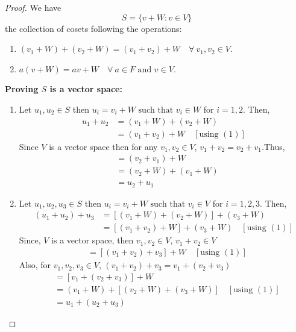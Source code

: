 \documentclass[12pt, a4paper]{article}
\theoremstyle{definition}
\theoremstyle{remark}
\newcommand{\st}{\text{ such that }}
\begin{document}
	\begin{proof}
		We have \[S = \{v+W:v \in V\}\] the collection of cosets following the operations:
		\begin{enumerate}
			\item $(v_1+W)+(v_2+W) = (v_1+v_2)+W \quad \forall \ v_1, v_2 \in V$.
			\item $a(v+W) = av+W \quad \forall \ a \in F \text{ and } v \in V$.
		\end{enumerate}
		
		\vspace{0.3cm}
		
		\noindent \textbf{Proving $S$ is a vector space:}
		
		\noindent \begin{enumerate}[label=(\alph*).]
			\item Let $u_1, u_2 \in S$ then $u_i = v_i + W \st v_i \in W$ for $i=1,2$. Then,
			\begin{align*}
				u_1 + u_2 &= (v_1 + W)+(v_2 + W)\\
				&= (v_1+v_2)+W \quad [\text{using } (1)]
			\end{align*}
			Since $V$ is a vector space then for any $v_1, v_2 \in V$, $v_1+v_2 = v_2+v_1$.Thus,
			\begin{align*}
				&= (v_2+v_1)+W \\
				&= (v_2 + W)+(v_1 + W)\\
				&= u_2 + u_1
			\end{align*}
			
			\item Let $u_1, u_2, u_3 \in S$ then $u_i = v_i+W \st v_i \in V$ for $i=1,2,3$. Then,
			\begin{align*}
				(u_1+u_2)+u_3 &= [(v_1+W) + (v_2+W)] + (v_3+W) \\
				&= [(v_1+v_2)+W] + (v_3+W) \quad [\text{using } (1)]
			\end{align*}
			Since, $V$ is a vector space, then $v_1, v_2 \in V$, $v_1+v_2 \in V$
			\begin{align*}
				&= [(v_1+v_2)+v_3]+W \quad [\text{using } (1)]
			\end{align*}
			Also, for $v_1, v_2, v_3 \in V$, $(v_1+v_2)+v_3 = v_1+(v_2+v_3)$
			\begin{align*}
				&= [v_1+(v_2+v_3)]+W \\
				&= (v_1+W) + [(v_2+W) + (v_3+W)] \quad [\text{using } (1)] \\
				&= u_1 + (u_2+u_3)
			\end{align*}
			

\end{enumerate}
\end{proof}
\end{document}
